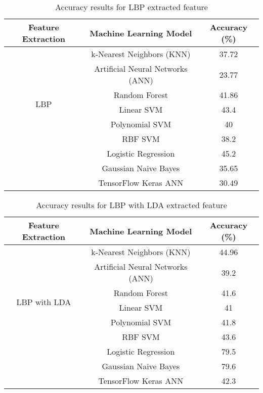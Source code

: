 \documentclass[a4paper]{article}
\theoremstyle{plain}
\theoremstyle{definition}
\begin{document}
\begin{table}[htbp]
\centering
\Large
\caption{Accuracy results for LBP extracted feature}
\label{tab:results}
\begin{tabular}{|c|c|c|}
\hline
\textbf{Feature Extraction} & \textbf{Machine Learning Model} & \textbf{Accuracy (\%)} \\ \hline
\multirow{7}{*}{LBP } & k-Nearest Neighbors (KNN) & 37.72 \\ \cline{2-3} 
 & Artificial Neural Networks (ANN) & 23.77 \\ \cline{2-3} 
 & Random Forest & 41.86 \\ \cline{2-3} 
 &  Linear SVM & 43.4 \\ \cline{2-3} 
 & Polynomial SVM & 40 \\ \cline{2-3} 
 & RBF SVM & 38.2 \\ \cline{2-3} 
 & Logistic Regression & 45.2 \\ \cline{2-3} 
 & Gaussian Naive Bayes & 35.65 \\ \cline{2-3}  
 & TensorFlow Keras ANN & 30.49 \\ \hline
\end{tabular}
\end{table}

\begin{table}[htbp]
\centering
\Large
\caption{Accuracy results for LBP with LDA extracted feature}
\label{tab:results}
\begin{tabular}{|c|c|c|}
\hline
\textbf{Feature Extraction} & \textbf{Machine Learning Model} & \textbf{Accuracy (\%)} \\ \hline
\multirow{7}{*}{LBP with LDA} & k-Nearest Neighbors (KNN) & 44.96 \\ \cline{2-3} 
 & Artificial Neural Networks (ANN) & 39.2 \\ \cline{2-3} 
 & Random Forest & 41.6 \\ \cline{2-3} 
 &  Linear SVM & 41 \\ \cline{2-3} 
 & Polynomial SVM & 41.8 \\ \cline{2-3} 
 & RBF SVM & 43.6 \\ \cline{2-3} 
 & Logistic Regression & 79.5 \\ \cline{2-3} 
 & Gaussian Naive Bayes & 79.6 \\ \cline{2-3}  
 & TensorFlow Keras ANN & 42.3 \\ \hline
\end{tabular}
\end{table}
\end{document}
